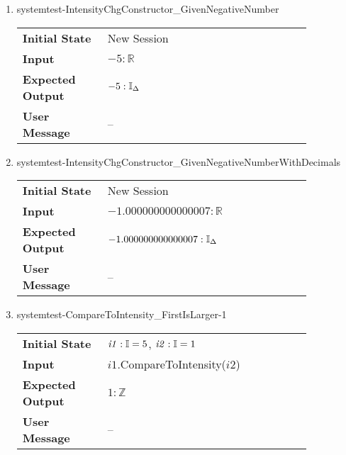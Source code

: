 \begin{enumerate}
    \item{systemtest-IntensityChgConstructor\_GivenNegativeNumber}
    \begin{table}[H]
        \centering
        \begin{tabular}{P{0.25\linewidth}P{0.6\linewidth}}
            \toprule
            \textbf{Initial State} & New Session \\
            \textbf{Input} & $-5 : \mathbb{R}$ \\ \midrule
            \textbf{Expected Output} & $-5 : \mathbb{I}_{\Delta}$ \\
            \textbf{User Message} & -- \\ \bottomrule
        \end{tabular}
    \end{table}



    \item{systemtest-IntensityChgConstructor\_GivenNegativeNumberWithDecimals}
    \begin{table}[H]
        \centering
        \begin{tabular}{P{0.25\linewidth}P{0.6\linewidth}}
            \toprule
            \textbf{Initial State} & New Session \\
            \textbf{Input} & $-1.000000000000007 : \mathbb{R}$ \\ \midrule
            \textbf{Expected Output} & $-1.000000000000007 : \mathbb{I}_{\Delta}$
            \\
            \textbf{User Message} & -- \\ \bottomrule
        \end{tabular}
    \end{table}

    \item{systemtest-CompareToIntensity\_FirstIsLarger-1}
    \begin{table}[H]
        \centering
        \begin{tabular}{P{0.25\linewidth}P{0.6\linewidth}}
            \toprule
            \textbf{Initial State} & $\mathit{i1} : \mathbb{I} = 5$,
            $\mathit{i2} : \mathbb{I} = 1$ \\
            \textbf{Input} & $\mathit{i1}$.CompareToIntensity($\mathit{i2}$) \\
            \midrule
            \textbf{Expected Output} & $1 : \mathbb{Z}$ \\
            \textbf{User Message} & -- \\ \bottomrule
        \end{tabular}
    \end{table}


\end{enumerate}
